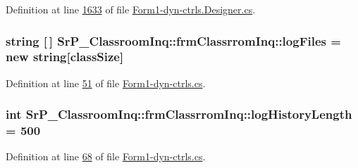 \-Definition at line \hyperlink{_form1-dyn-ctrls_8_designer_8cs_source_l01633}{1633} of file \hyperlink{_form1-dyn-ctrls_8_designer_8cs_source}{\-Form1-\/dyn-\/ctrls.\-Designer.\-cs}.

\hypertarget{class_sr_p___classroom_inq_1_1frm_classrrom_inq_a1b23b6935997df29f1b06ed831495076}{
\subsubsection[{log\-Files}]{\setlength{\rightskip}{0pt plus 5cm}string \mbox{[}$\,$\mbox{]} {\bf \-Sr\-P\-\_\-\-Classroom\-Inq\-::frm\-Classrrom\-Inq\-::log\-Files} = new string\mbox{[}{\bf class\-Size}\mbox{]}}}
\label{class_sr_p___classroom_inq_1_1frm_classrrom_inq_a1b23b6935997df29f1b06ed831495076}


\-Definition at line \hyperlink{_form1-dyn-ctrls_8cs_source_l00051}{51} of file \hyperlink{_form1-dyn-ctrls_8cs_source}{\-Form1-\/dyn-\/ctrls.\-cs}.

\hypertarget{class_sr_p___classroom_inq_1_1frm_classrrom_inq_a0b55eb955abb243808249457ac92ca93}{
\subsubsection[{log\-History\-Length}]{\setlength{\rightskip}{0pt plus 5cm}int {\bf \-Sr\-P\-\_\-\-Classroom\-Inq\-::frm\-Classrrom\-Inq\-::log\-History\-Length} = 500}}
\label{class_sr_p___classroom_inq_1_1frm_classrrom_inq_a0b55eb955abb243808249457ac92ca93}


\-Definition at line \hyperlink{_form1-dyn-ctrls_8cs_source_l00068}{68} of file \hyperlink{_form1-dyn-ctrls_8cs_source}{\-Form1-\/dyn-\/ctrls.\-cs}.

